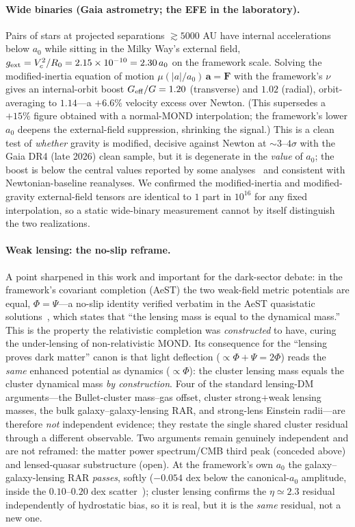 \documentclass[aps,prd,twocolumn,10pt,nofootinbib,superscriptaddress]{revtex4-2}
\begin{document}
\paragraph{Wide binaries (Gaia astrometry; the EFE in the laboratory).} Pairs of stars at projected separations
$\gtrsim5000$ AU have internal accelerations below $a_0$ while sitting in the Milky Way's external field,
$g_{\rm ext}=V_c^2/R_0=2.15\times10^{-10}=2.30\,a_0$ on the framework scale. Solving the modified-inertia equation of
motion $\mu(|a|/a_0)\,\mathbf{a}=\mathbf{F}$ with the framework's $\nu$ gives an internal-orbit boost
$G_{\rm eff}/G=1.20$ (transverse) and $1.02$ (radial), orbit-averaging to $\mathbf{1.14}$---a $+6.6\%$ velocity
excess over Newton. (This supersedes a $+15\%$ figure obtained with a normal-MOND interpolation; the framework's
lower $a_0$ deepens the external-field suppression, shrinking the signal.) This is a clean test of \emph{whether}
gravity is modified, decisive against Newton at $\sim3$--$4\sigma$ with the Gaia DR4 (late 2026) clean sample, but it
is degenerate in the \emph{value} of $a_0$; the boost is below the central values reported by some
analyses~\cite{Chae2024} and consistent with Newtonian-baseline reanalyses. We confirmed the modified-inertia and
modified-gravity external-field tensors are identical to $1$ part in $10^{16}$ for any fixed interpolation, so a
static wide-binary measurement cannot by itself distinguish the two realizations.

\paragraph{Weak lensing: the no-slip reframe.} A point sharpened in this work and important for the dark-sector
debate: in the framework's covariant completion (AeST) the two weak-field metric potentials are equal,
$\Phi=\Psi$---a no-slip identity verified verbatim in the AeST quasistatic solutions~\cite{Verwayen2024}, which
states that ``the lensing mass is equal to the dynamical mass.'' This is the property the relativistic completion
was \emph{constructed} to have, curing the under-lensing of non-relativistic MOND. Its consequence for the
``lensing proves dark matter'' canon is that light deflection ($\propto\Phi+\Psi=2\Phi$) reads the \emph{same}
enhanced potential as dynamics ($\propto\Phi$): the cluster lensing mass equals the cluster dynamical mass
\emph{by construction}. Four of the standard lensing-DM arguments---the Bullet-cluster mass--gas offset, cluster
strong$+$weak lensing masses, the bulk galaxy--galaxy-lensing RAR, and strong-lens Einstein radii---are therefore
\emph{not} independent evidence; they restate the single shared cluster residual through a different observable. Two
arguments remain genuinely independent and are not reframed: the matter power spectrum/CMB third peak (conceded
above) and lensed-quasar substructure (open). At the framework's own $a_0$ the galaxy--galaxy-lensing RAR
\emph{passes}, softly ($-0.054$ dex below the canonical-$a_0$ amplitude, inside the $0.10$--$0.20$ dex
scatter~\cite{Brouwer2021}); cluster lensing confirms the $\eta\!\simeq\!2.3$ residual independently of
hydrostatic bias, so it is real, but it is the \emph{same} residual, not a new one.
\end{document}
